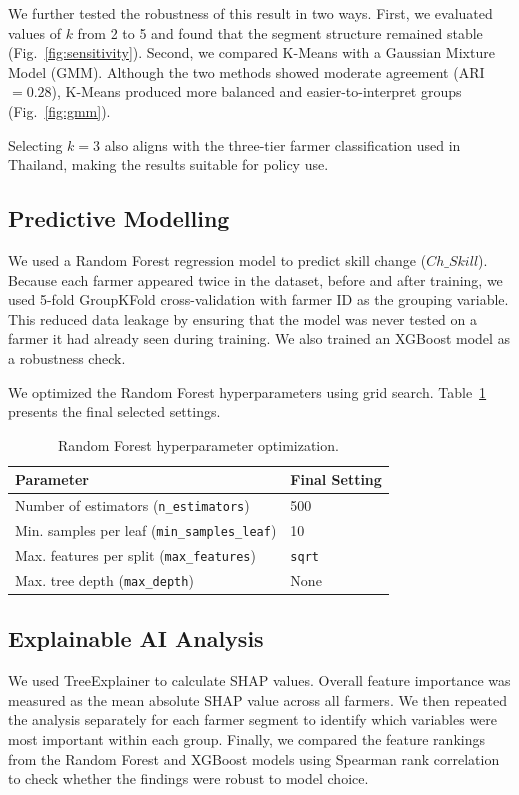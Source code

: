\documentclass[fleqn,10pt,lineno]{wlpeerj}
\begin{document}
We further tested the robustness of this result in two ways. First, we evaluated values of $k$ from 2 to 5 and found that the segment structure remained stable (Fig.~\ref{fig:sensitivity}). Second, we compared K-Means with a Gaussian Mixture Model (GMM). Although the two methods showed moderate agreement (ARI $= 0.28$), K-Means produced more balanced and easier-to-interpret groups (Fig.~\ref{fig:gmm}).

Selecting $k = 3$ also aligns with the three-tier farmer classification used in Thailand, making the results suitable for policy use.

\subsection{Predictive Modelling}
We used a Random Forest regression model \citep{breiman2001} to predict skill change ($Ch\_Skill$). Because each farmer appeared twice in the dataset, before and after training, we used 5-fold GroupKFold cross-validation with farmer ID as the grouping variable. This reduced data leakage by ensuring that the model was never tested on a farmer it had already seen during training. We also trained an XGBoost model \citep{chen2016} as a robustness check.

We optimized the Random Forest hyperparameters using grid search. Table~\ref{tab:hyperparameters} presents the final selected settings.

\begin{table}[htbp]
\centering
\caption{Random Forest hyperparameter optimization.}
\label{tab:hyperparameters}
\begin{tabular}{@{}ll@{}}
\toprule
\textbf{Parameter} & \textbf{Final Setting} \\
\midrule
Number of estimators (\texttt{n\_estimators}) & 500 \\
Min. samples per leaf (\texttt{min\_samples\_leaf}) & 10 \\
Max. features per split (\texttt{max\_features}) & \texttt{sqrt} \\
Max. tree depth (\texttt{max\_depth}) & None \\
\bottomrule
\end{tabular}
\end{table}

\subsection{Explainable AI Analysis}
We used TreeExplainer \citep{lundberg2017} to calculate SHAP values. Overall feature importance was measured as the mean absolute SHAP value across all farmers. We then repeated the analysis separately for each farmer segment to identify which variables were most important within each group. Finally, we compared the feature rankings from the Random Forest and XGBoost models using Spearman rank correlation to check whether the findings were robust to model choice.
\end{document}
